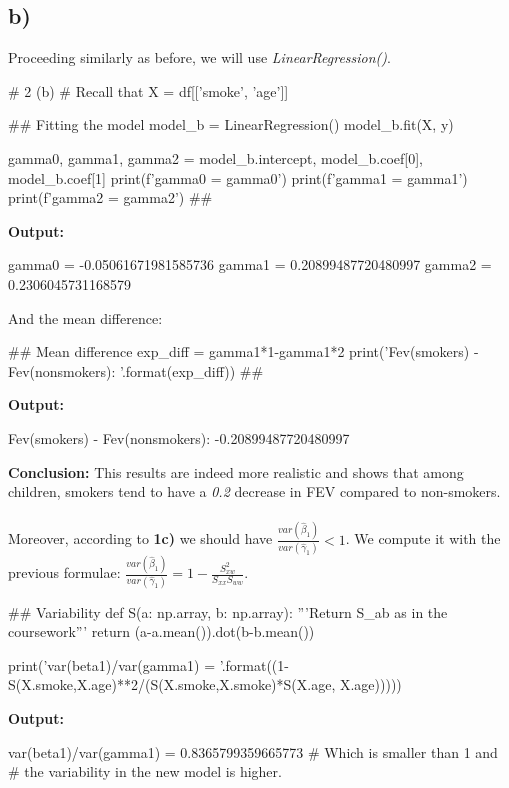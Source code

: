 \documentclass[a4paper]{article}
\begin{document}
\subsection{b)}
Proceeding similarly as before, we will use \textit{LinearRegression()}.
\begin{python}
	# 2 (b)
	# Recall that X = df[['smoke', 'age']]
	
	## Fitting the model
	model_b = LinearRegression()
	model_b.fit(X, y)
	
	gamma0, gamma1, gamma2 = model_b.intercept, model_b.coef[0], model_b.coef[1]
	print(f'gamma0 = {gamma0}')
	print(f'gamma1 = {gamma1}')
	print(f'gamma2 = {gamma2}')
	##
\end{python}
\textbf{Output:}
\begin{python}
	gamma0 = -0.05061671981585736
	gamma1 = 0.20899487720480997
	gamma2 = 0.2306045731168579
\end{python}
And the mean difference:
\begin{python}
	## Mean difference
	exp_diff = gamma1*1-gamma1*2
	print('Fev(smokers) - Fev(nonsmokers): {}'.format(exp_diff))
	##
\end{python}
\textbf{Output:}
\begin{python}
	Fev(smokers) - Fev(nonsmokers): -0.20899487720480997
\end{python}
\textbf{Conclusion:} This results are indeed more realistic and shows that among children, smokers tend to have a \textit{0.2} decrease in FEV compared to non-smokers.\\
\\
Moreover, according to \textbf{1c)} we should have $\frac{var(\hat{\beta}_{1})}{var(\hat{\gamma}_{1})}<1$. We compute it with the previous formulae: $\frac{var(\hat{\beta}_{1})}{var(\hat{\gamma}_{1})} = 1-\frac{S_{xw}^2}{S_{xx}S_{ww}}$.

\begin{python}
	## Variability
	def S(a: np.array, b: np.array):
	    '''Return S_{ab} as in the coursework'''
	    return (a-a.mean()).dot(b-b.mean())
	
	print('var(beta1)/var(gamma1) = {}'.format((1-S(X.smoke,X.age)**2/(S(X.smoke,X.smoke)*S(X.age, X.age)))))
\end{python}
\textbf{Output:}
\begin{python}
	var(beta1)/var(gamma1) = 0.8365799359665773
	# Which is smaller than 1 and 
	# the variability in the new model is higher.
\end{python}
\end{document}
